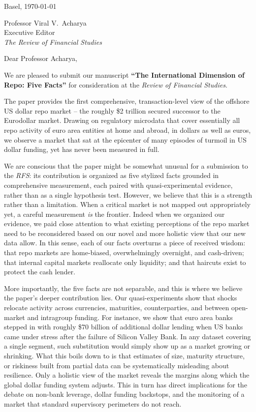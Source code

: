 \documentclass[11pt,a4paper]{article}
\begin{document}
\begin{flushright}
Basel, \today
\end{flushright}

Professor Viral V.\ Acharya\\
Executive Editor\\
\emph{The Review of Financial Studies}

\vspace{0.5em}

Dear Professor Acharya,

We are pleased to submit our manuscript \textbf{``The International Dimension of Repo: Five Facts''} for consideration at the \emph{Review of Financial Studies}.

The paper provides the first comprehensive, transaction-level view of the offshore US dollar repo market -- the roughly \$2 trillion secured successor to the Eurodollar market. Drawing on regulatory microdata that cover essentially all repo activity of euro area entities at home and abroad, in dollars as well as euros, we observe a market that sat at the epicenter of many episodes of turmoil in US dollar funding, yet has never been measured in full.

We are conscious that the paper might be somewhat unusual for a submission to the \emph{RFS}: its contribution is organized as five stylized facts grounded in comprehensive measurement, each paired with quasi-experimental evidence, rather than as a single hypothesis test. However, we believe that this is a strength rather than a limitation. When a critical market is not mapped out appropriately yet, a careful measurement \emph{is} the frontier. Indeed when we organized our evidence, we paid close attention to what existing perceptions of the repo market need to be reconsidered based on our novel and more holistic view that our new data allow. In this sense, each of our facts overturns a piece of received wisdom: that repo markets are home-biased, overwhelmingly overnight, and cash-driven; that internal capital markets reallocate only liquidity; and that haircuts exist to protect the cash lender.

More importantly, the five facts are not separable, and this is where we believe the paper's deeper contribution lies. Our quasi-experiments show that shocks relocate activity across currencies, maturities, counterparties, and between open-market and intragroup funding. For instance, we show that euro area banks stepped in with roughly \$70 billion of additional dollar lending when US banks came under stress after the failure of Silicon Valley Bank. In any dataset covering a single segment, such substitution would simply show up as a market growing or shrinking. What this boils down to is that estimates of size, maturity structure, or riskiness built from partial data can be systematically misleading about resilience. Only a holistic view of the market reveals the margins along which the global dollar funding system adjusts. This in turn has direct implications for the debate on non-bank leverage, dollar funding backstops, and the monitoring of a market that standard supervisory perimeters do not reach.
\end{document}
